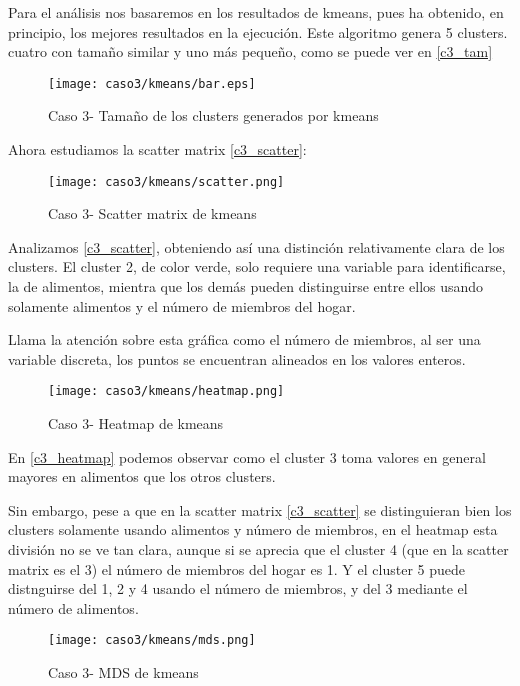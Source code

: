 Para el análisis nos basaremos en los resultados de kmeans, pues ha obtenido, en principio, los mejores resultados en la ejecución. Este algoritmo genera 5 clusters. cuatro con tamaño similar y uno más pequeño, como se puede ver en \eqref{c3_tam}

\begin{figure}[H]
\caption{Caso 3- Tamaño de los clusters generados por kmeans}
\label{c3_tam}
\texttt{[image: caso3/kmeans/bar.eps]}
\end{figure}

Ahora estudiamos la scatter matrix \eqref{c3_scatter}:

\begin{figure}[H]
\caption{Caso 3- Scatter matrix de kmeans}
\label{c3_scatter}
\texttt{[image: caso3/kmeans/scatter.png]}
\end{figure}

Analizamos \eqref{c3_scatter}, obteniendo así una distinción relativamente clara de los clusters. El cluster 2, de color verde, solo requiere una variable para identificarse, la de alimentos, mientra que los demás pueden distinguirse entre ellos usando solamente alimentos y el número de miembros del hogar.

Llama la atención sobre esta gráfica como el número de miembros, al ser una variable discreta, los puntos se encuentran alineados en los valores enteros.

\begin{figure}[H]
\caption{Caso 3- Heatmap de kmeans}
\label{c3_heatmap}
\texttt{[image: caso3/kmeans/heatmap.png]}
\end{figure}

En \eqref{c3_heatmap} podemos observar como el cluster 3 toma valores en general mayores en alimentos que los otros clusters.

Sin embargo, pese a que en la scatter matrix \eqref{c3_scatter} se distinguieran bien los clusters solamente usando alimentos y número de miembros, en el heatmap esta división no se ve tan clara, aunque si se aprecia que el cluster 4 (que en la scatter matrix es el 3) el número de miembros del hogar es 1. Y el cluster 5 puede distnguirse del 1, 2 y 4 usando el número de miembros, y del 3 mediante el número de alimentos.


\begin{figure}[H]
\caption{Caso 3- MDS de kmeans}
\label{c3_mds}
\texttt{[image: caso3/kmeans/mds.png]}
\end{figure}

